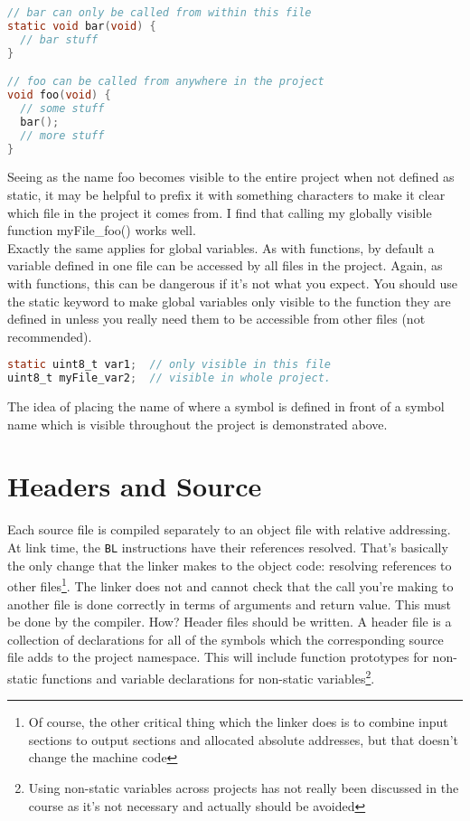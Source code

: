 \begin{lstlisting}[language=C]
// bar can only be called from within this file
static void bar(void) {
  // bar stuff
}

// foo can be called from anywhere in the project
void foo(void) {
  // some stuff
  bar();
  // more stuff
}
\end{lstlisting}

Seeing as the name foo becomes visible to the entire project when not defined as static, it may be helpful to prefix it with something characters to make it clear which file in the project it comes from. I find that calling my globally visible function myFile\_foo() works well. \\

Exactly the same applies for global variables. As with functions, by default a variable defined in one file can be accessed by all files in the project. Again, as with functions, this can be dangerous if it's not what you expect. You should use the static keyword to make global variables only visible to the function they are defined in unless you really need them to be accessible from other files (not recommended).

\begin{lstlisting}[language=C]
static uint8_t var1;  // only visible in this file
uint8_t myFile_var2;  // visible in whole project.
\end{lstlisting}

The idea of placing the name of where a symbol is defined in front of a symbol name which is visible throughout the project is demonstrated above. 

\section{Headers and Source}
Each source file is compiled separately to an object file with relative addressing.
At link time, the \texttt{BL} instructions have their references resolved. That's basically the only change that the linker makes to the object code: resolving references to other files\footnote{Of course, the other critical thing which the linker does is to combine input sections to output sections and allocated absolute addresses, but that doesn't change the machine code}.
The linker does not and cannot check that the call you're making to another file is done correctly in terms of arguments and return value.
This must be done by the compiler. How?
Header files should be written. A header file is a collection of declarations for all of the symbols which the corresponding source file adds to the project namespace.
This will include function prototypes for non-static functions and variable declarations for non-static variables\footnote{Using non-static variables across projects has not really been discussed in the course as it's not necessary and actually should be avoided}. 

